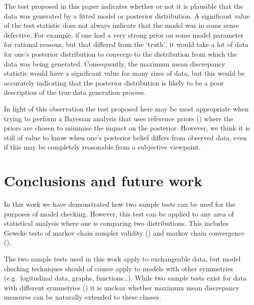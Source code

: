 \documentclass{article} %
\def\eg{e.g.\ }
\begin{document}
The test proposed in this paper indicates whether or not it is plausible that the data was generated by a fitted model or posterior distribution.
A significant value of the test statistic does not always indicate that the model was in some sense defective.
For example, if one had a very strong prior on some model parameter for rational reasons, but that differed from the `truth', it would take a lot of data for one's posterior distribution to converge to the distribution from which the data was being generated.
Consequently, the maximum mean discrepancy statistic would have a significant value for many sizes of data, but this would be accurately indicating that the posterior distribution is likely to be a poor description of the true data generation process.

In light of this observation the test proposed here may be most appropriate when trying to perform a Bayesian analysis that uses reference priors () where the priors are chosen to minimise the impact on the posterior.
However, we think it is still of value to know when one's posterior belief differs from observed data, even if this may be completely reasonable from a subjective viewpoint.

\section{Conclusions and future work}


In this work we have demonstrated how two sample tests can be used for the purposes of model checking.
However, this test can be applied to any area of statistical analysis where one is comparing two distributions.
This includes Geweke tests of markov chain sampler validity () and markov chain convergence ().

The two sample tests used in this work apply to exchangeable data, but model checking techniques should of course apply to models with other symmetries (\eg logitudinal data, graphs, functions\ldots).
While two sample tests exist for data with different symmetries () it is unclear whether maximum mean discrepancy measures can be naturally extended to these classes.



\end{document}
